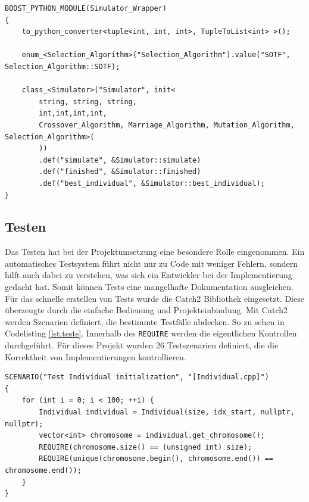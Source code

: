 \begin{minipage}{\linewidth}
\begin{lstlisting}[caption={C++ zu Python Schnittstelle}, firstnumber=1, captionpos=b, label=lst:boostpython]
BOOST_PYTHON_MODULE(Simulator_Wrapper)
{
	to_python_converter<tuple<int, int, int>, TupleToList<int> >();

	enum_<Selection_Algorithm>("Selection_Algorithm").value("SOTF", Selection_Algorithm::SOTF);

	class_<Simulator>("Simulator", init<
		string, string, string,
		int,int,int,int,
		Crossover_Algorithm, Marriage_Algorithm, Mutation_Algorithm, Selection_Algorithm>(
		))
 		.def("simulate", &Simulator::simulate)
		.def("finished", &Simulator::finished)
		.def("best_individual", &Simulator::best_individual);
}
\end{lstlisting}
\end{minipage}
\subsection{Testen}
Das Testen hat bei der Projektumsetzung eine besondere Rolle eingenommen. Ein automatisches Testsystem führt nicht nur zu Code mit weniger Fehlern, sondern hilft auch dabei zu verstehen, was sich ein Entwickler bei der Implementierung gedacht hat. Somit können Tests eine mangelhafte Dokumentation ausgleichen.\\
Für das schnelle erstellen von Tests wurde die Catch2 Bibliothek eingesetzt. Diese überzeugte durch die einfache Bedienung und Projekteinbindung.
Mit Catch2 werden Szenarien definiert, die bestimmte Testfälle abdecken. So zu sehen in Codelisting \ref{lst:tests}. Innerhalb des \texttt{REQUIRE} werden die eigentlichen Kontrollen durchgeführt.
Für dieses Projekt wurden 26 Testszenarien definiert, die die Korrektheit von Implementierungen kontrollieren.
\begin{minipage}{\linewidth}
\begin{lstlisting}[caption={Unit-Tests}, firstnumber=1, captionpos=b, label=lst:tests]
SCENARIO("Test Individual initialization", "[Individual.cpp]")
{
	for (int i = 0; i < 100; ++i) {
		Individual individual = Individual(size, idx_start, nullptr, nullptr);
		vector<int> chromosome = individual.get_chromosome();
		REQUIRE(chromosome.size() == (unsigned int) size);
		REQUIRE(unique(chromosome.begin(), chromosome.end()) == chromosome.end());
	}
}
\end{lstlisting}
\end{minipage}
